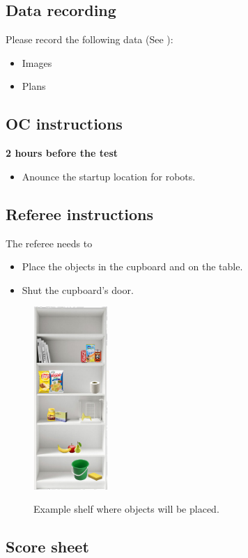\subsection{Data recording}
  Please record the following data (See ):
  \begin{itemize}
   \item Images
   \item Plans
  \end{itemize}

\subsection{OC instructions}

\textbf{2 hours before the test}
\begin{itemize}
    \item Anounce the startup location for robots.
\end{itemize}

\subsection{Referee instructions}
The referee needs to
\begin{itemize}
\item Place the objects in the cupboard and on the table.
\item Shut the cupboard's door.
\end{itemize}

\begin{figure}
  \centering
  \includegraphics[width=0.25\textwidth]{images/storing_groceries.png}
  \vspace{-10pt}
  \label{fig:storing_groceries}
  \caption{Example shelf where objects will be placed.}
\end{figure}

\subsection{Score sheet}


